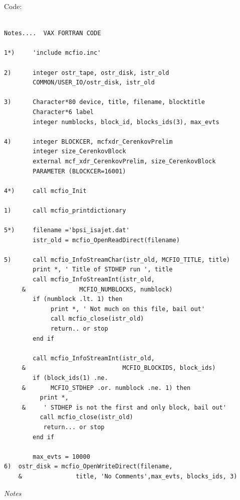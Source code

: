 \vspace{.1in}
 Code:
\begin{verbatim}

Notes....  VAX FORTRAN CODE

1*) 	'include mcfio.inc'

2)      integer ostr_tape, ostr_disk, istr_old
        COMMON/USER_IO/ostr_disk, istr_old

3)      Character*80 device, title, filename, blocktitle
        Character*6 label
        integer numblocks, block_id, blocks_ids(3), max_evts

4)      integer BLOCKCER, mcfxdr_CerenkovPrelim
        integer size_CerenkovBlock
        external mcf_xdr_CerenkovPrelim, size_CerenkovBlock
        PARAMETER (BLOCKCER=16001)

4*)     call mcfio_Init

1)      call mcfio_printdictionary

5*)     filename ='bpsi_isajet.dat'
        istr_old = mcfio_OpenReadDirect(filename)

5)      call mcfio_InfoStreamChar(istr_old, MCFIO_TITLE, title)
        print *, ' Title of STDHEP run ', title
        call mcfio_InfoStreamInt(istr_old,
     &               MCFIO_NUMBLOCKS, numblock)
        if (numblock .lt. 1) then
             print *, ' Not much on this file, bail out'
             call mcfio_close(istr_old)
             return.. or stop
        end if

        call mcfio_InfoStreamInt(istr_old,
     &                           MCFIO_BLOCKIDS, block_ids)
        if (block_ids(1) .ne.
     &       MCFIO_STDHEP .or. numblock .ne. 1) then
          print *,
     &     ' STDHEP is not the first and only block, bail out'
          call mcfio_close(istr_old)
           return... or stop
        end if

        max_evts = 10000
6)	ostr_disk = mcfio_OpenWriteDirect(filename,
    &               title, 'No Comments',max_evts, blocks_ids, 3)

\end{verbatim}

\vspace{.1in}

{\em Notes}

\vspace{.1in}


